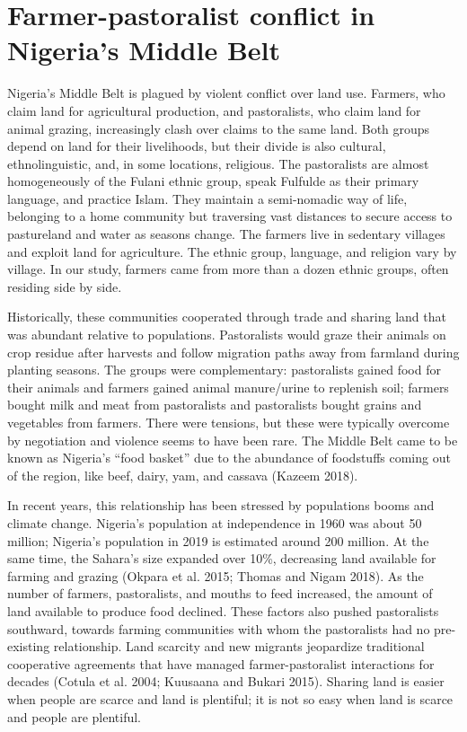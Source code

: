 \documentclass[11pt]{article}
\begin{document}
\hypertarget{farmer-pastoralist-conflict-in-nigerias-middle-belt}{%
\section{Farmer-pastoralist conflict in Nigeria's Middle
Belt}\label{farmer-pastoralist-conflict-in-nigerias-middle-belt}}

Nigeria's Middle Belt is plagued by violent conflict over land use.
Farmers, who claim land for agricultural production, and pastoralists,
who claim land for animal grazing, increasingly clash over claims to the
same land. Both groups depend on land for their livelihoods, but their
divide is also cultural, ethnolinguistic, and, in some locations,
religious. The pastoralists are almost homogeneously of the Fulani
ethnic group, speak Fulfulde as their primary language, and practice
Islam. They maintain a semi-nomadic way of life, belonging to a home
community but traversing vast distances to secure access to pastureland
and water as seasons change. The farmers live in sedentary villages and
exploit land for agriculture. The ethnic group, language, and religion
vary by village. In our study, farmers came from more than a dozen
ethnic groups, often residing side by side.

Historically, these communities cooperated through trade and sharing
land that was abundant relative to populations. Pastoralists would graze
their animals on crop residue after harvests and follow migration paths
away from farmland during planting seasons. The groups were
complementary: pastoralists gained food for their animals and farmers
gained animal manure/urine to replenish soil; farmers bought milk and
meat from pastoralists and pastoralists bought grains and vegetables
from farmers. There were tensions, but these were typically overcome by
negotiation and violence seems to have been rare. The Middle Belt came
to be known as Nigeria's ``food basket'' due to the abundance of
foodstuffs coming out of the region, like beef, dairy, yam, and cassava
(Kazeem 2018).

In recent years, this relationship has been stressed by populations
booms and climate change. Nigeria's population at independence in 1960
was about 50 million; Nigeria's population in 2019 is estimated around
200 million. At the same time, the Sahara's size expanded over 10\%,
decreasing land available for farming and grazing (Okpara et al. 2015;
Thomas and Nigam 2018). As the number of farmers, pastoralists, and
mouths to feed increased, the amount of land available to produce food
declined. These factors also pushed pastoralists southward, towards
farming communities with whom the pastoralists had no pre-existing
relationship. Land scarcity and new migrants jeopardize traditional
cooperative agreements that have managed farmer-pastoralist interactions
for decades (Cotula et al. 2004; Kuusaana and Bukari 2015). Sharing land
is easier when people are scarce and land is plentiful; it is not so
easy when land is scarce and people are plentiful.
\end{document}
